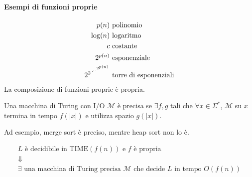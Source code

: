 \paragraph{Esempi di funzioni proprie}
\begin{align*}
    p(n) & \text{ polinomio} \\
    \log(n) & \text{ logaritmo} \\
    c & \text{ costante} \\
    2^{p(n)} & \text{ esponenziale} \\
    2^{2^{\rdots^{2^{p(n)}}}} & \text{ torre di esponenziali}
\end{align*}
La composizione di funzioni proprie è propria.

\begin{definition}
    Una macchina di Turing con I/O $\mathcal{M}$ è precisa se $\exists f,g$ tali che $\forall x \in \Sigma^*$, $\mathcal{M}$ su $x$ termina in tempo $f(|x|)$ e utilizza spazio $g(|x|)$.
\end{definition}
Ad esempio, merge sort è preciso, mentre heap sort non lo è.

\begin{theorem}
    \begin{eqnarray*}
        & L \text{ è decidibile in TIME$(f(n))$ e $f$ è propria} &\\
        &\Downarrow& \\
        & \exists \text{ una macchina di Turing precisa $\mathcal{M}$ che decide $L$ in tempo }O(f(n)) &
    \end{eqnarray*}
\end{theorem}
